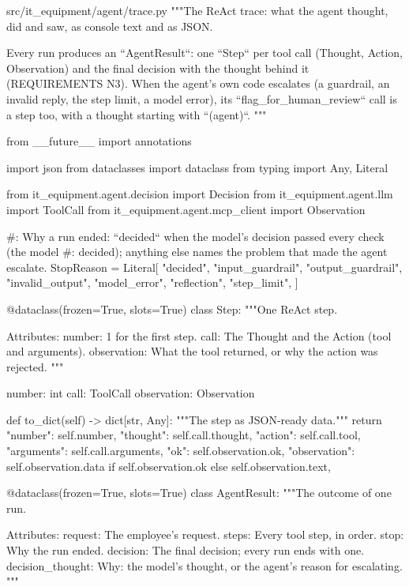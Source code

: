\documentclass[11pt,letterpaper]{article}
\renewcommand{\_}{\textunderscore\allowbreak}
\begin{document}
\begin{codebox}{src/it_equipment/agent/trace.py}
"""The ReAct trace: what the agent thought, did and saw, as console text and as JSON.

Every run produces an ``AgentResult``: one ``Step`` per tool call (Thought, Action,
Observation) and the final decision with the thought behind it (REQUIREMENTS N3). When the
agent's own code escalates (a guardrail, an invalid reply, the step limit, a model error), its
``flag_for_human_review`` call is a step too, with a thought starting with ``(agent)``.
"""

from __future__ import annotations

import json
from dataclasses import dataclass
from typing import Any, Literal

from it_equipment.agent.decision import Decision
from it_equipment.agent.llm import ToolCall
from it_equipment.agent.mcp_client import Observation

#: Why a run ended: ``decided`` when the model's decision passed every check (the model
#: decided); anything else names the problem that made the agent escalate.
StopReason = Literal[
    "decided",
    "input_guardrail",
    "output_guardrail",
    "invalid_output",
    "model_error",
    "reflection",
    "step_limit",
]


@dataclass(frozen=True, slots=True)
class Step:
    """One ReAct step.

    Attributes:
        number: 1 for the first step.
        call: The Thought and the Action (tool and arguments).
        observation: What the tool returned, or why the action was rejected.
    """

    number: int
    call: ToolCall
    observation: Observation

    def to_dict(self) -> dict[str, Any]:
        """The step as JSON-ready data."""
        return {
            "number": self.number,
            "thought": self.call.thought,
            "action": self.call.tool,
            "arguments": self.call.arguments,
            "ok": self.observation.ok,
            "observation": self.observation.data if self.observation.ok else self.observation.text,
        }


@dataclass(frozen=True, slots=True)
class AgentResult:
    """The outcome of one run.

    Attributes:
        request: The employee's request.
        steps: Every tool step, in order.
        stop: Why the run ended.
        decision: The final decision; every run ends with one.
        decision_thought: Why: the model's thought, or the agent's reason for escalating.
    """


\end{codebox}
\end{document}
